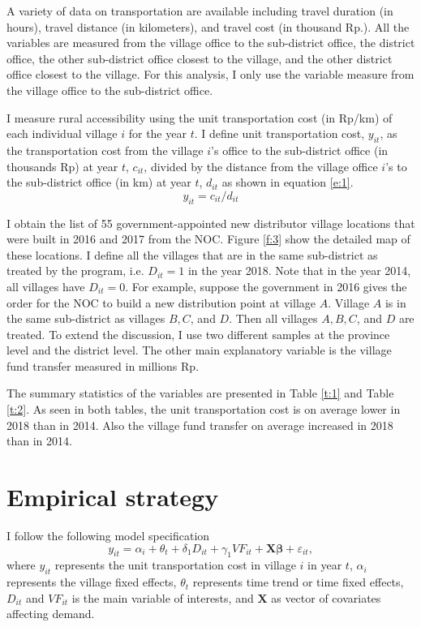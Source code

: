 \documentclass[letterpaper,12pt,leqno]{article}
\begin{document}
A variety of data on transportation are available including travel duration (in hours), travel distance (in kilometers), and travel cost (in thousand Rp.). All the variables are measured from the village office to the sub-district office, the district office, the other sub-district office closest to the village, and the other district office closest to the village. For this analysis, I only use the variable measure from the village office to the sub-district office.

I measure rural accessibility using the unit transportation cost (in Rp/km) of each individual village $i$ for the year $t$. I define unit transportation cost, $y_{it}$, as the transportation cost from the village $i$'s office to the sub-district office (in thousands Rp) at year $t$, $c_{it}$, divided by the distance from the village office $i$'s to the sub-district office (in km) at year $t$, $d_{it}$ as shown in equation \eqref{e:1}.
\begin{equation}
        y_{it}=c_{it}/d_{it}\label{e:1}
\end{equation}

I obtain the list of 55 government-appointed new distributor village locations that were built in 2016 and 2017 from the NOC. Figure \ref{f:3} show the detailed map of these locations. I define all the villages that are in the same sub-district as treated by the program, i.e. $D_{it}=1$ in the year 2018. Note that in the year 2014, all villages have $D_{it}=0$. For example, suppose the government in 2016 gives the order for the NOC to build a new distribution point at village $A$. Village $A$ is in the same sub-district as villages $B,C$, and $D$. Then all villages $A,B,C$, and $D$ are treated. To extend the discussion, I use two different samples at the province level and the district level. The other main explanatory variable is the village fund transfer measured in millions Rp.

The summary statistics of the variables are presented in Table \ref{t:1} and Table \ref{t:2}. As seen in both tables, the  unit transportation cost is on average lower in 2018 than in 2014. Also the village fund transfer on average increased in 2018 than in 2014.


\section{Empirical strategy}\label{s:strategy}

I follow the following model specification
\begin{equation}
    y_{it}=\alpha_i+\theta_t+\delta_1 D_{it}+\gamma_1 VF_{it}+\textbf{X}\pmb{\beta}+\varepsilon_{it},\label{e:2}
\end{equation}
where $y_{it}$ represents the unit transportation cost in village $i$ in year $t$,
$\alpha_i$ represents the village fixed effects, $\theta_t$ represents time trend or time fixed effects, $D_{it}$ and $VF_{it}$ is the main variable of interests, and $\textbf{X}$ as vector of covariates affecting demand. 
\end{document}
